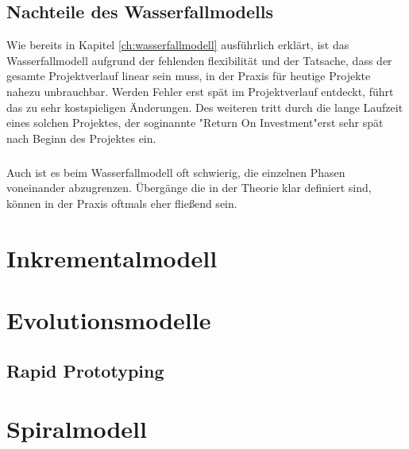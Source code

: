\documentclass[a4paper, twopage]{scrreprt}
\begin{document}
\section{Nachteile des Wasserfallmodells}
\label{sec:wasserfallmodell_nachteile}
Wie bereits in Kapitel \ref{ch:wasserfallmodell} ausführlich erklärt, ist das Wasserfallmodell aufgrund der fehlenden flexibilität und der Tatsache, dass der gesamte Projektverlauf linear sein muss, in der Praxis für heutige Projekte nahezu unbrauchbar. Werden Fehler erst spät im Projektverlauf entdeckt, führt das zu sehr kostspieligen Änderungen. Des weiteren tritt durch die lange Laufzeit eines solchen Projektes, der soginannte "Return On Investment"\footnotemark erst sehr spät nach Beginn des Projektes ein.
\paragraph*{}
Auch ist es beim Wasserfallmodell oft schwierig, die einzelnen Phasen voneinander abzugrenzen. Übergänge die in der Theorie klar definiert sind, können in der Praxis oftmals eher fließend sein.

\chapter{Inkrementalmodell}

\chapter{Evolutionsmodelle}

\section{Rapid Prototyping}

\chapter{Spiralmodell}


\nocite{*}
\printbibliography

\listoffigures
\end{document}
